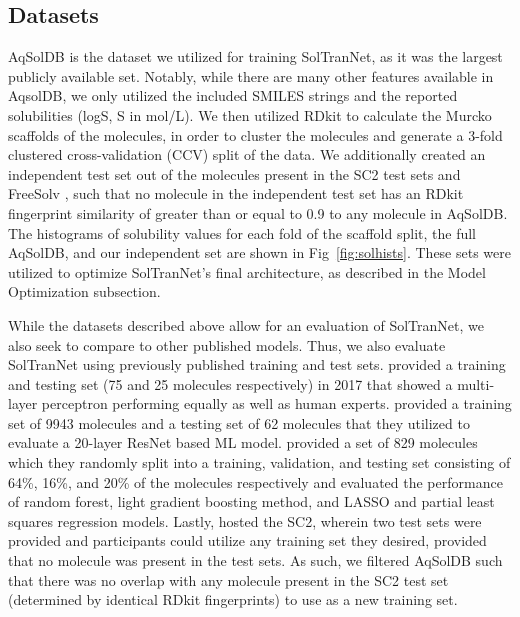 \documentclass[journal=jcim,manuscript=applicationnotes]{achemso}
\begin{document}
\subsection{Datasets}
AqSolDB\cite{AqSol} is the dataset we utilized for training SolTranNet, as it was the largest publicly available set.
Notably, while there are many other features available in AqsolDB, we only utilized the included SMILES strings and the reported solubilities (logS, S in mol/L).
We then utilized RDkit\cite{rdkit} to calculate the Murcko scaffolds of the molecules, in order to cluster the molecules and generate a 3-fold clustered cross-validation (CCV) split of the data.
We additionally created an independent test set out of the molecules present in the SC2 test sets \cite{llinas} and FreeSolv \cite{freesolv}, such that no molecule in the independent test set has an RDkit fingerprint similarity of greater than or equal to 0.9 to any molecule in AqSolDB.
The histograms of solubility values for each fold of the scaffold split, the full AqSolDB, and our independent set are shown in Fig~\ref{fig:solhists}.
These sets were utilized to optimize SolTranNet's final architecture, as described in the Model Optimization subsection.

While the datasets described above allow for an evaluation of SolTranNet, we also seek to compare to other published models.
Thus, we also evaluate SolTranNet using previously published training and test sets.
\citet{boobier} provided a training and testing set (75 and 25 molecules respectively) in 2017 that showed a multi-layer perceptron performing equally as well as human experts.
\citet{cui} provided a training set of 9943 molecules and a testing set of 62 molecules that they utilized to evaluate a 20-layer ResNet based ML model.
\citet{lovric} provided a set of 829 molecules which they randomly split into a training, validation, and testing set consisting of 64\%, 16\%, and 20\% of the molecules respectively and evaluated the performance of random forest, light gradient boosting method, and LASSO and partial least squares regression models.
Lastly, \citet{llinas} hosted the SC2, wherein two test sets were provided and participants could utilize any training set they desired, provided that no molecule was present in the test sets.
As such, we filtered AqSolDB such that there was no overlap with any molecule present in the SC2 test set (determined by identical RDkit fingerprints) to use as a new training set.
\end{document}
